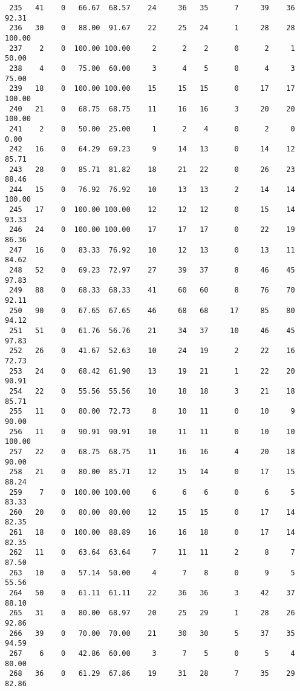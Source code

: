 \begin{verbatim}
 235   41    0   66.67  68.57    24     36   35      7     39    36    92.31
 236   30    0   88.00  91.67    22     25   24      1     28    28   100.00
 237    2    0  100.00 100.00     2      2    2      0      2     1    50.00
 238    4    0   75.00  60.00     3      4    5      0      4     3    75.00
 239   18    0  100.00 100.00    15     15   15      0     17    17   100.00
 240   21    0   68.75  68.75    11     16   16      3     20    20   100.00
 241    2    0   50.00  25.00     1      2    4      0      2     0     0.00
 242   16    0   64.29  69.23     9     14   13      0     14    12    85.71
 243   28    0   85.71  81.82    18     21   22      0     26    23    88.46
 244   15    0   76.92  76.92    10     13   13      2     14    14   100.00
 245   17    0  100.00 100.00    12     12   12      0     15    14    93.33
 246   24    0  100.00 100.00    17     17   17      0     22    19    86.36
 247   16    0   83.33  76.92    10     12   13      0     13    11    84.62
 248   52    0   69.23  72.97    27     39   37      8     46    45    97.83
 249   88    0   68.33  68.33    41     60   60      8     76    70    92.11
 250   90    0   67.65  67.65    46     68   68     17     85    80    94.12
 251   51    0   61.76  56.76    21     34   37     10     46    45    97.83
 252   26    0   41.67  52.63    10     24   19      2     22    16    72.73
 253   24    0   68.42  61.90    13     19   21      1     22    20    90.91
 254   22    0   55.56  55.56    10     18   18      3     21    18    85.71
 255   11    0   80.00  72.73     8     10   11      0     10     9    90.00
 256   11    0   90.91  90.91    10     11   11      0     10    10   100.00
 257   22    0   68.75  68.75    11     16   16      4     20    18    90.00
 258   21    0   80.00  85.71    12     15   14      0     17    15    88.24
 259    7    0  100.00 100.00     6      6    6      0      6     5    83.33
 260   20    0   80.00  80.00    12     15   15      0     17    14    82.35
 261   18    0  100.00  88.89    16     16   18      0     17    14    82.35
 262   11    0   63.64  63.64     7     11   11      2      8     7    87.50
 263   10    0   57.14  50.00     4      7    8      0      9     5    55.56
 264   50    0   61.11  61.11    22     36   36      3     42    37    88.10
 265   31    0   80.00  68.97    20     25   29      1     28    26    92.86
 266   39    0   70.00  70.00    21     30   30      5     37    35    94.59
 267    6    0   42.86  60.00     3      7    5      0      5     4    80.00
 268   36    0   61.29  67.86    19     31   28      7     35    29    82.86

\end{verbatim}
